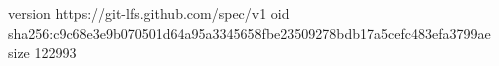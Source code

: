 version https://git-lfs.github.com/spec/v1
oid sha256:c9c68e3e9b070501d64a95a3345658fbe23509278bdb17a5cefc483efa3799ae
size 122993
